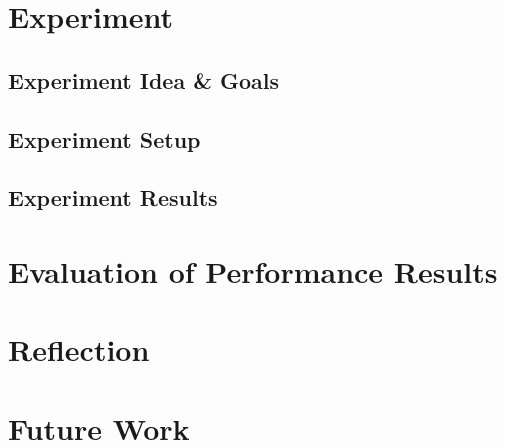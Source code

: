 \documentclass[	runningheads,
				a4paper]{llncs}
\begin{document}
\section{Experiment}


	\subsection{Experiment Idea \& Goals}
	\subsection{Experiment Setup}
	\subsection{Experiment Results}

\section{Evaluation of Performance Results}

\section{Reflection}

\section{Future Work}
	
	
	
	
	
\end{document}
